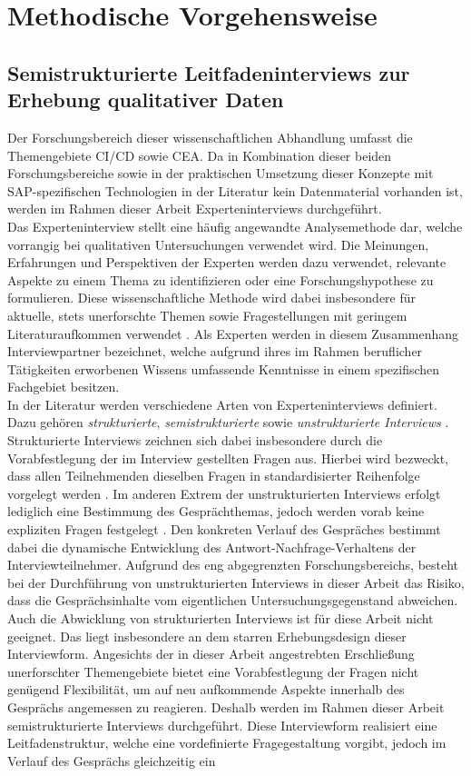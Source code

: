 \section{Methodische Vorgehensweise} 
\subsection{Semistrukturierte Leitfadeninterviews zur Erhebung qualitativer Daten}
Der Forschungsbereich dieser wissenschaftlichen Abhandlung umfasst die Themengebiete CI/CD sowie CEA. Da in Kombination dieser beiden Forschungsbereiche sowie in der praktischen Umsetzung dieser Konzepte mit SAP-spezifischen Technologien in der Literatur kein Datenmaterial vorhanden ist, werden im Rahmen dieser Arbeit Experteninterviews durchgeführt.\\ 
Das Experteninterview stellt eine häufig angewandte Analysemethode dar, welche vorrangig bei qualitativen Untersuchungen verwendet wird. Die Meinungen, Erfahrungen und Perspektiven der Experten werden dazu verwendet, relevante Aspekte zu einem Thema zu identifizieren oder eine Forschungshypothese zu formulieren. Diese wissenschaftliche Methode wird dabei insbesondere für aktuelle, stets unerforschte Themen sowie Fragestellungen mit geringem Literaturaufkommen verwendet \cite[S. 33 ff.]{Kaiser.2021}. Als Experten werden in diesem Zusammenhang Interviewpartner bezeichnet, welche aufgrund ihres im Rahmen beruflicher Tätigkeiten erworbenen Wissens umfassende Kenntnisse in einem spezifischen Fachgebiet besitzen.\\ In der Literatur werden verschiedene Arten von Experteninterviews definiert. Dazu gehören \textit{strukturierte}, \textit{semistrukturierte} sowie \textit{unstrukturierte Interviews} \cite[S. 84 ff.]{Kaiser.2021}. Strukturierte Interviews zeichnen sich dabei insbesondere durch die Vorabfestlegung der im Interview gestellten Fragen aus. Hierbei wird bezweckt, dass allen Teilnehmenden dieselben Fragen in standardisierter Reihenfolge vorgelegt werden \cite[S. 421 ff.]{Aghamanoukjan.2009}. Im anderen Extrem der unstrukturierten Interviews erfolgt lediglich eine Bestimmung des Gesprächthemas, jedoch werden vorab keine expliziten Fragen festgelegt \cite[S. 441 ff.]{Aghamanoukjan.2009}. Den konkreten Verlauf des Gespräches bestimmt dabei die dynamische Entwicklung des Antwort-Nachfrage-Verhaltens der Interviewteilnehmer. Aufgrund des eng abgegrenzten Forschungsbereichs, besteht bei der Durchführung von unstrukturierten Interviews in dieser Arbeit das Risiko, dass die Gesprächsinhalte vom eigentlichen Untersuchungsgegenstand abweichen. Auch die Abwicklung von strukturierten Interviews ist für diese Arbeit nicht geeignet. Das liegt insbesondere an dem starren Erhebungsdesign dieser Interviewform. Angesichts der in dieser Arbeit angestrebten Erschließung unerforschter Themengebiete bietet eine Vorabfestlegung der Fragen nicht genügend Flexibilität, um auf neu aufkommende Aspekte innerhalb des Gesprächs angemessen zu reagieren. Deshalb werden im Rahmen dieser Arbeit semistrukturierte Interviews durchgeführt. Diese Interviewform realisiert eine Leitfadenstruktur, welche eine vordefinierte Fragegestaltung vorgibt, jedoch im Verlauf des Gesprächs gleichzeitig ein 